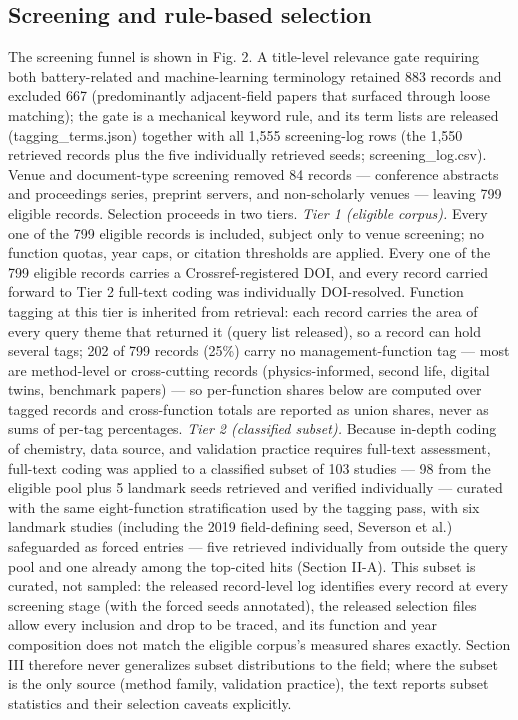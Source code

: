 \documentclass[journal]{IEEEtran}
\begin{document}
\subsection{Screening and rule-based selection}

The screening funnel is shown in Fig. 2. A title-level relevance gate requiring both battery-related and machine-learning terminology retained 883 records and excluded 667 (predominantly adjacent-field papers that surfaced through loose matching); the gate is a mechanical keyword rule, and its term lists are released (tagging\_terms.json) together with all 1,555 screening-log rows (the 1,550 retrieved records plus the five individually retrieved seeds; screening\_log.csv). Venue and document-type screening removed 84 records --- conference abstracts and proceedings series, preprint servers, and non-scholarly venues --- leaving 799 eligible records. Selection proceeds in two tiers. \textit{Tier 1 (eligible corpus).} Every one of the 799 eligible records is included, subject only to venue screening; no function quotas, year caps, or citation thresholds are applied. Every one of the 799 eligible records carries a Crossref-registered DOI, and every record carried forward to Tier 2 full-text coding was individually DOI-resolved. Function tagging at this tier is inherited from retrieval: each record carries the area of every query theme that returned it (query list released), so a record can hold several tags; 202 of 799 records (25\%) carry no management-function tag --- most are method-level or cross-cutting records (physics-informed, second life, digital twins, benchmark papers) --- so per-function shares below are computed over tagged records and cross-function totals are reported as union shares, never as sums of per-tag percentages. \textit{Tier 2 (classified subset).} Because in-depth coding of chemistry, data source, and validation practice requires full-text assessment, full-text coding was applied to a classified subset of 103 studies --- 98 from the eligible pool plus 5 landmark seeds retrieved and verified individually --- curated with the same eight-function stratification used by the tagging pass, with six landmark studies (including the 2019 field-defining seed, Severson et al.) safeguarded as forced entries --- five retrieved individually from outside the query pool and one already among the top-cited hits (Section II-A). This subset is curated, not sampled: the released record-level log identifies every record at every screening stage (with the forced seeds annotated), the released selection files allow every inclusion and drop to be traced, and its function and year composition does not match the eligible corpus's measured shares exactly. Section III therefore never generalizes subset distributions to the field; where the subset is the only source (method family, validation practice), the text reports subset statistics and their selection caveats explicitly.
\end{document}
